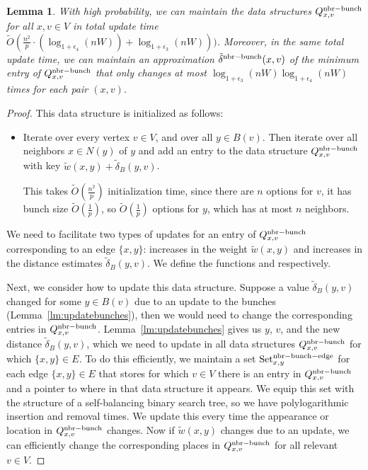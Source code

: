 \documentclass[11pt]{article}
\newtheorem{lemma}[theorem]{Lemma}
\theoremstyle{definition}
\theoremstyle{remark}
\begin{document}
\begin{lemma}\label{lm:NbrBunchDS}
    With high probability, we can maintain the data structures $Q^{\rm{nbr-bunch}}_{x,v}$ for all $x,v\in V$ in total update time $ \tilde O (\tfrac{n^2}{p}\cdot (\log_{1+\epsilon_4}(nW))+\log_{1+\epsilon_3}(nW))) $. Moreover, in the same total update time, we can maintain an approximation $\tilde\delta^{\rm{nbr-bunch}}(x,v)$ of the minimum entry of $Q^{\rm{nbr-bunch}}_{x,v}$ that only changes at most $\log_{1+\epsilon_3}(nW)\log_{1+\epsilon_4}(nW)$ times for each pair $(x,v)$.
\end{lemma}
\begin{proof}
    This data structure is initialized as follows:
    \begin{itemize}
        \item Iterate over every vertex $v\in V$, and over all $y\in B(v)$. Then iterate over all neighbors $x\in N(y)$ of $y$ and add an entry to the data structure $Q^{\rm{nbr-bunch}}_{x,v}$ with key $\tilde{w}(x,y) + \tilde \delta_B(y,v)$.
    
        This takes $ \tilde O (\tfrac{n^2}{p}) $ initialization time, since there are $n$ options for $v$, it has bunch size $\tilde O(\tfrac{1}{p})$, so $\tilde O(\tfrac{1}{p})$ options for $y$, which has at most $n$ neighbors. 
    \end{itemize}
    We need to facilitate two types of updates for an entry of $Q^{\rm{nbr-bunch}}_{x,v}$ corresponding to an edge $\{x,y\}$: increases in the weight $\tilde w(x,y)$ and increases in the distance estimates $\tilde\delta_B(y,v)$. We define the functions \UpdateNbrBunchDSEdgeChange and \UpdateNbrBunchDSBunchChange respectively. 
    
    Next, we consider how to update this data structure. Suppose a value $\tilde\delta_B(y,v)$ changed for some $y\in B(v)$ due to an update to the bunches (Lemma~\ref{lm:updatebunches}), then we would need to change the corresponding entries in $Q^{\rm{nbr-bunch}}_{x,v}$. Lemma~\ref{lm:updatebunches} gives us $y$, $v$, and the new distance $\tilde \delta_B(y,v)$, which we need to update in all data structures $Q^{\rm{nbr-bunch}}_{x,v}$ for which $\{x,y\}\in E$. To do this efficiently, we maintain a set $\text{Set}_{x,y}^{\rm{nbr-bunch-edge}}$ for each edge $\{x,y\}\in E$ that stores for which $v\in V$ there is an entry in $Q^{\rm{nbr-bunch}}_{x,v}$ and a pointer to where in that data structure it appears. We equip this set with the structure of a self-balancing binary search tree, so we have polylogarithmic insertion and removal times. We update this every time the appearance or location in $Q^{\rm{nbr-bunch}}_{x,v}$ changes. Now if $\tilde w(x,y)$ changes due to an update, we can efficiently change the corresponding places in $Q^{\rm{nbr-bunch}}_{x,v}$ for all relevant $v\in V$.
    

\end{proof}
\end{document}
